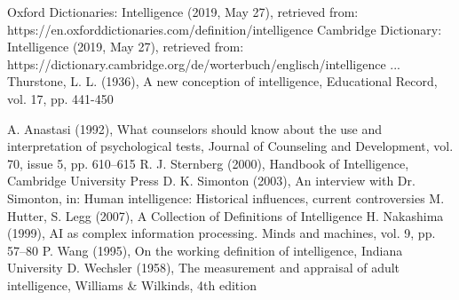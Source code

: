 \documentclass[conference]{IEEEtran}
\begin{document}
\begin{thebibliography}{00}

 Oxford Dictionaries: Intelligence (2019, May 27), retrieved from: https://en.oxforddictionaries.com/definition/intelligence
 Cambridge Dictionary: Intelligence (2019, May 27), retrieved from: https://dictionary.cambridge.org/de/worterbuch/englisch/intelligence
 ... %
 Thurstone, L. L. (1936), A new conception of intelligence, Educational Record, vol. 17, pp. 441-450


 A. Anastasi (1992), What counselors should know about the use and interpretation of psychological tests, Journal of Counseling and Development, vol. 70, issue 5, pp. 610–615
 R. J. Sternberg (2000), Handbook of Intelligence, Cambridge University Press
 D. K. Simonton (2003), An interview with Dr. Simonton, in: Human intelligence: Historical influences, current controversies
 M. Hutter, S. Legg (2007), A Collection of Definitions of Intelligence
 H. Nakashima (1999), AI as complex information processing. Minds and machines, vol. 9, pp. 57–80
 P. Wang (1995), On the working definition of intelligence, Indiana University
 D. Wechsler (1958), The measurement and appraisal of adult intelligence, Williams \& Wilkinds, 4th edition



\end{thebibliography}
\end{document}
